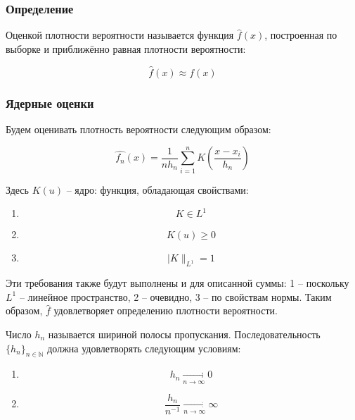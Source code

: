 \subsubsection{Определение}

Оценкой плотности вероятности называется функция $\hat{f}(x)$, построенная по выборке и приближённо равная плотности вероятности:

\begin{equation}
\hat{f}(x) \approx f(x)
\end{equation}

\subsubsection{Ядерные оценки}

Будем оценивать плотность вероятности следующим образом:

\begin{equation}
\hat{f_n}(x) = \displaystyle \frac{1}{nh_n}\sum_{i=1}^{n}{K\left(\frac{x - x_i}{h_n}\right)}
\end{equation}

Здесь $K(u)$ -- ядро: функция, обладающая свойствами:
\begin{enumerate}
	\item \begin{equation}K \in L^1 \end{equation}
	\item \begin{equation}K(u) \geq 0 \end{equation}   
	\item \begin{equation}|K\|_{L^1}=1\end{equation} \label{kde_norm}
\end{enumerate}

Эти требования также будут выполнены и для описанной суммы: 1 -- поскольку $L^1$ -- линейное пространство, 2 -- очевидно, 3 -- по свойствам нормы. Таким образом, $\hat{f}$ удовлетворяет определению плотности вероятности.

Число $h_n$ называется шириной полосы пропускания.
Последовательность $\{h_n\}_{n \in \mathbb{N}}$ должна удовлетворять следующим условиям:
\begin{enumerate}
\item 
	\begin{equation}
	h_n \underset{n \rightarrow \infty}{\longrightarrow} 0
	\end{equation}
\item 
	\begin{equation}
	\frac{h_n}{n^{-1}} \underset{n \rightarrow \infty}{\longrightarrow} \infty
	\end{equation}
\end{enumerate}

